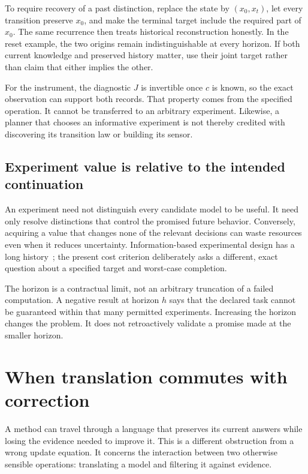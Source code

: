 \documentclass[11pt,letterpaper]{article}
\theoremstyle{plain}
\theoremstyle{definition}
\begin{document}
To require recovery of a past distinction, replace the state by $(x_0,x_t)$, let every transition preserve $x_0$, and make the terminal target include the required part of $x_0$. The same recurrence then treats historical reconstruction honestly. In the reset example, the two origins remain indistinguishable at every horizon. If both current knowledge and preserved history matter, use their joint target rather than claim that either implies the other.

For the instrument, the diagnostic $J$ is invertible once $c$ is known, so the exact observation can support both records. That property comes from the specified operation. It cannot be transferred to an arbitrary experiment. Likewise, a planner that chooses an informative experiment is not thereby credited with discovering its transition law or building its sensor.

\subsection{Experiment value is relative to the intended continuation}
An experiment need not distinguish every candidate model to be useful. It need only resolve distinctions that control the promised future behavior. Conversely, acquiring a value that changes none of the relevant decisions can waste resources even when it reduces uncertainty. Information-based experimental design has a long history~\cite{lindley}; the present cost criterion deliberately asks a different, exact question about a specified target and worst-case completion.

The horizon is a contractual limit, not an arbitrary truncation of a failed computation. A negative result at horizon $h$ says that the declared task cannot be guaranteed within that many permitted experiments. Increasing the horizon changes the problem. It does not retroactively validate a promise made at the smaller horizon.


\section{When translation commutes with correction}\label{sec:correctiontransport}
A method can travel through a language that preserves its current answers while losing the evidence needed to improve it. This is a different obstruction from a wrong update equation. It concerns the interaction between two otherwise sensible operations: translating a model and filtering it against evidence.
\end{document}
